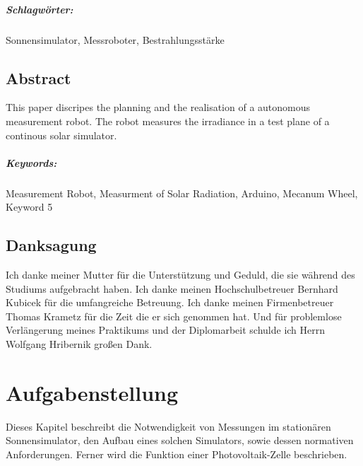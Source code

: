 \documentclass[a4paper,bibtotoc,oneside]{scrbook}
\begin{document}
\paragraph*{Schlagwörter:} Sonnensimulator, Messroboter, Bestrahlungsstärke


\newpage

\section*{Abstract}\thispagestyle{empty}
This paper discripes the planning and the realisation of a autonomous measurement robot. The robot measures the irradiance in a test plane of a continous solar simulator.
\\ \vfill
\paragraph*{Keywords:} Measurement Robot, Measurment of Solar Radiation, Arduino, Mecanum Wheel, Keyword 5
\newpage

\section*{Danksagung}\thispagestyle{empty}
Ich danke meiner Mutter für die Unterstützung und Geduld, die sie während des Studiums aufgebracht haben.
Ich danke meinen Hochschulbetreuer Bernhard Kubicek für die umfangreiche Betreuung.
Ich danke meinen Firmenbetreuer Thomas Krametz für die Zeit die er sich genommen hat.
Und für problemlose Verlängerung meines Praktikums und der Diplomarbeit schulde ich Herrn Wolfgang Hribernik großen Dank.
\newpage

\tableofcontents\thispagestyle{empty}
\newpage

\setcounter{page}{1}

\chapter{Aufgabenstellung}

Dieses Kapitel beschreibt die Notwendigkeit von Messungen im stationären Sonnensimulator, den Aufbau eines solchen Simulators, sowie dessen normativen Anforderungen. Ferner wird die Funktion einer Photovoltaik-Zelle beschrieben.
\end{document}
